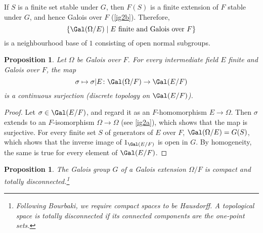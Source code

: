 \documentclass[a4paper,11pt,final,openany]{memoir}
\newtheorem{proposition}[X]{Proposition}
\theoremstyle{nonumberplain}
\newtheorem{proof}{Proof.}
\begin{document}
If $S$ is a finite set stable under $G$, then $F(S)$ is a finite extension of
$F$ stable under $G$, and hence Galois over $F$ (\ref{ig2b}). Therefore,
\[
\left\{  \Gal(\Omega/E)\mid E\text{ finite and Galois over }F\right\}
\]
is a neighbourhood base of $1$ consisting of open normal subgroups.

\begin{proposition}
\label{ig3b}Let $\Omega$ be Galois over $F$. For every intermediate field $E$
finite and Galois over $F$, the map
\[
\sigma\mapsto\sigma|E\colon\Gal(\Omega/F)\rightarrow\Gal(E/F)
\]
is a continuous surjection (discrete topology on $\Gal(E/F)$).
\end{proposition}

\begin{proof}
Let $\sigma\in\Gal(E/F)$, and regard it as an $F$-homomorphism $E\rightarrow
\Omega$. Then $\sigma$ extends to an $F$-isomorphism $\Omega\rightarrow\Omega$
(see \ref{ig2a}), which shows that the map is surjective. For every finite set
$S$ of generators of $E$ over $F$, $\Gal(\Omega/E)=G(S)$, which shows that the
inverse image of $1_{\Gal(E/F)}$ is open in $G$. By homogeneity, the same is
true for every element of $\Gal(E/F)$.
\end{proof}

\begin{proposition}
\label{ig3d}The Galois group $G$ of a Galois extension $\Omega/F$ is compact
and totally disconnected.\footnote{Following Bourbaki, we require compact
spaces to be Hausdorff. A topological space is \emph{totally disconnected }if
its connected components are the one-point sets.}
\end{proposition}
\end{document}
